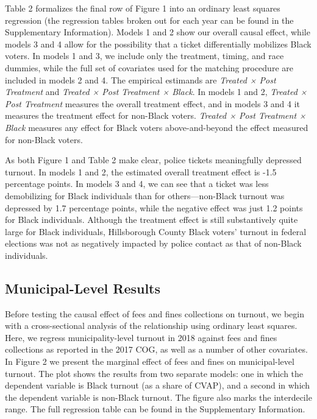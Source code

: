 \documentclass[
  12pt,
]{article}
\begin{document}
Table 2 formalizes the final row of Figure 1 into an ordinary least squares regression (the regression tables broken out for each year can be found in the Supplementary Information). Models 1 and 2 show our overall causal effect, while models 3 and 4 allow for the possibility that a ticket differentially mobilizes Black voters. In models 1 and 3, we include only the treatment, timing, and race dummies, while the full set of covariates used for the matching procedure are included in models 2 and 4. The empirical estimands are \emph{Treated × Post Treatment} and \emph{Treated × Post Treatment × Black}. In models 1 and 2, \emph{Treated × Post Treatment} measures the overall treatment effect, and in models 3 and 4 it measures the treatment effect for non-Black voters. \emph{Treated × Post Treatment × Black} measures any effect for Black voters above-and-beyond the effect measured for non-Black voters.

\begin{singlespace}

\end{singlespace}

As both Figure 1 and Table 2 make clear, police tickets meaningfully depressed turnout. In models 1 and 2, the estimated overall treatment effect is -1.5 percentage points. In models 3 and 4, we can see that a ticket was less demobilizing for Black individuals than for others---non-Black turnout was depressed by 1.7 percentage points, while the negative effect was just 1.2 points for Black individuals. Although the treatment effect is still substantively quite large for Black individuals, Hillsborough County Black voters' turnout in federal elections was not as negatively impacted by police contact as that of non-Black individuals.

\hypertarget{municipal-level-results}{%
\subsection*{Municipal-Level Results}\label{municipal-level-results}}

Before testing the causal effect of fees and fines collections on turnout, we begin with a cross-sectional analysis of the relationship using ordinary least squares. Here, we regress municipality-level turnout in 2018 against fees and fines collections as reported in the 2017 COG, as well as a number of other covariates. In Figure 2 we present the marginal effect of fees and fines on municipal-level turnout. The plot shows the results from two separate models: one in which the dependent variable is Black turnout (as a share of CVAP), and a second in which the dependent variable is non-Black turnout. The figure also marks the interdecile range. The full regression table can be found in the Supplementary Information.
\end{document}
